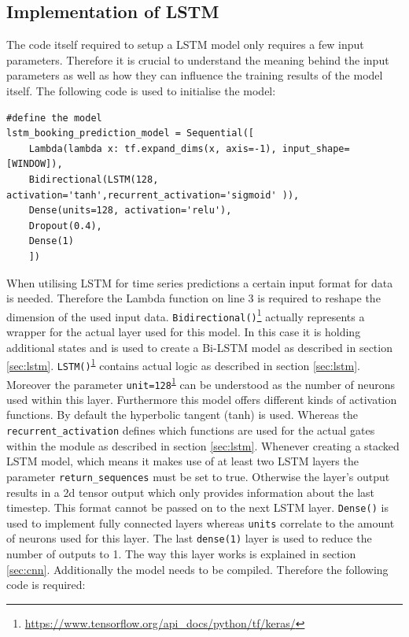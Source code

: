 \subsection{Implementation of LSTM}
The code itself required to setup a LSTM model only requires a few input parameters. Therefore it is crucial to understand the meaning behind the input parameters as well as how they can influence the training results of the model itself. The following code is used to initialise the model:   
\begin{lstlisting}
#define the model
lstm_booking_prediction_model = Sequential([
    Lambda(lambda x: tf.expand_dims(x, axis=-1), input_shape=[WINDOW]),
    Bidirectional(LSTM(128, activation='tanh',recurrent_activation='sigmoid' )),
    Dense(units=128, activation='relu'),
    Dropout(0.4),
    Dense(1)
	])
\end{lstlisting}
When utilising LSTM for time series predictions a certain input format for data is needed. Therefore the Lambda function on line 3 is required to reshape the dimension of the used input data. 
\verb|Bidirectional()|\footnote{\label{tf_fn}\url{https://www.tensorflow.org/api_docs/python/tf/keras/}} actually represents a wrapper for the actual layer used for this model. In this case it is holding additional states and is used to create a Bi-LSTM model as described in section \ref{sec:lstm}. \newline
\verb|LSTM()|\textsuperscript{\ref{tf_fn}} contains actual logic as described in section \ref{sec:lstm}. Moreover the parameter \verb|unit=128|\textsuperscript{\ref{tf_fn}} can be understood as the number of neurons used within this layer. Furthermore this model offers different kinds of activation functions. By default the hyperbolic tangent (tanh)\cite{tanh} is used. Whereas the \verb|recurrent_activation| defines which functions are used for the actual gates within the module as described in section \ref{sec:lstm}. Whenever creating a stacked LSTM model, which means it makes use of at least two LSTM layers the parameter \verb|return_sequences| must be set to true. Otherwise the layer's output results in a 2d tensor output which only provides information about the last timestep. This format cannot be passed on to the next LSTM layer. \newline
\verb|Dense()| is used to implement fully connected layers whereas \verb|units| correlate to the amount of neurons used for this layer. The last \verb|dense(1)| layer is used to reduce the number of outputs to 1. The way this layer works is explained in section \ref{sec:cnn}. Additionally the model needs to be compiled. Therefore the following code is required: 

